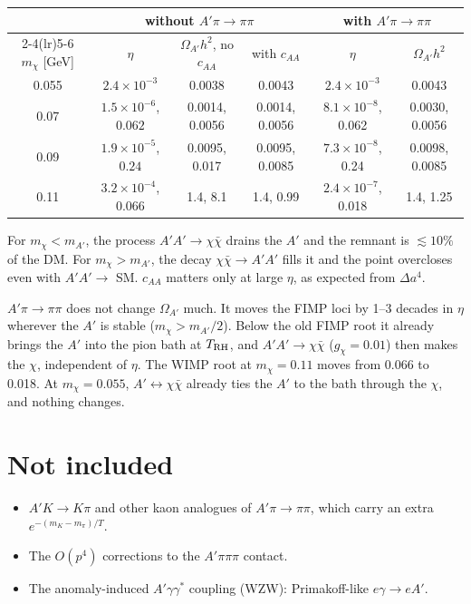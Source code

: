 \documentclass{article}
\newcommand{\Da}{\Delta a}
\begin{document}
\begin{center}
\begin{tabular}{cccccc}
\toprule
& \multicolumn{3}{c}{without $A'\pi\to\pi\pi$} & \multicolumn{2}{c}{with $A'\pi\to\pi\pi$}\\
\cmidrule(lr){2-4}\cmidrule(lr){5-6}
$m_\chi$ [GeV] & $\eta$ & $\Omega_{A'}h^2$, no $c_{AA}$ & with $c_{AA}$ & $\eta$ & $\Omega_{A'}h^2$\\
\midrule
0.055 & $2.4\times10^{-3}$ & 0.0038 & 0.0043 & $2.4\times10^{-3}$ & 0.0043\\
0.07 & $1.5\times10^{-6}$, $0.062$ & 0.0014, 0.0056 & 0.0014, 0.0056 & $8.1\times10^{-8}$, 0.062 & 0.0030, 0.0056\\
0.09 & $1.9\times10^{-5}$, $0.24$ & 0.0095, 0.017 & 0.0095, 0.0085 & $7.3\times10^{-8}$, 0.24 & 0.0098, 0.0085\\
0.11 & $3.2\times10^{-4}$, $0.066$ & 1.4, 8.1 & 1.4, 0.99 & $2.4\times10^{-7}$, 0.018 & 1.4, 1.25\\
\bottomrule
\end{tabular}
\end{center}
For $m_\chi<m_{A'}$, the process $A'A'\to\chi\bar\chi$ drains the $A'$ and the remnant is
$\lesssim10\%$ of the DM. For $m_\chi>m_{A'}$, the decay $\chi\bar\chi\to A'A'$ fills it and the
point overcloses even with $A'A'\to$ SM. $c_{AA}$ matters only at large $\eta$, as expected from
$\Da^4$.

$A'\pi\to\pi\pi$ does not change $\Omega_{A'}$ much. It moves the FIMP loci by 1--3 decades in
$\eta$ wherever the $A'$ is stable ($m_\chi>m_{A'}/2$). Below the old FIMP root it already
brings the $A'$ into the pion bath at $T_{\rm RH}$, and $A'A'\to\chi\bar\chi$ ($g_\chi=0.01$) then
makes the $\chi$, independent of $\eta$. The WIMP root at $m_\chi=0.11$ moves from 0.066 to
0.018. At $m_\chi=0.055$, $A'\leftrightarrow\chi\bar\chi$ already ties the $A'$ to the bath
through the $\chi$, and nothing changes.

\section{Not included}

\begin{itemize}
\item $A'K\to K\pi$ and other kaon analogues of $A'\pi\to\pi\pi$, which carry an extra
  $e^{-(m_K-m_\pi)/T}$.
\item The $O(p^4)$ corrections to the $A'\pi\pi\pi$ contact.
\item The anomaly-induced $A'\gamma\gamma^*$ coupling (WZW): Primakoff-like $e\gamma\to eA'$.
\end{itemize}
\end{document}
